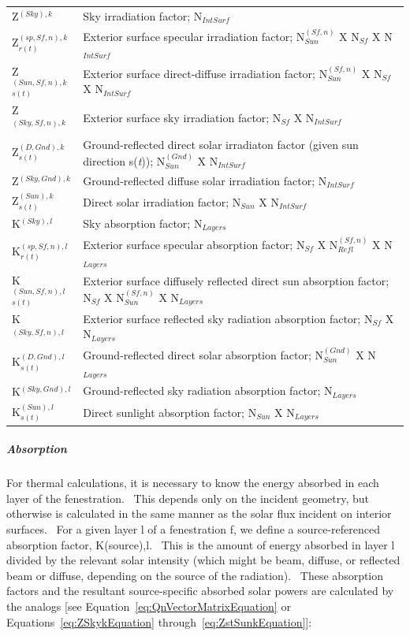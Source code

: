 \begin{longtable}[c]{p{1.5in}p{4.5in}}
Z\(^{(Sky), k}\) & Sky irradiation factor; N\(_{IntSurf}\) \tabularnewline
Z\(^{(sp,Sf,n),k}_{r(t)}\) & Exterior surface specular irradiation factor; N\(^{(Sf,n)}_{Sun}\) X N\(_{Sf}\) X N\(_{IntSurf}\) \tabularnewline
Z\(^{(Sun,Sf,n),k}_{s(t)}\) & Exterior surface direct-diffuse irradiation factor; N\(^{(Sf,n)}_{Sun}\) X N\(_{Sf}\) X N\(_{IntSurf}\) \tabularnewline
Z\(^{(Sky,Sf,n),k}\) & Exterior surface sky irradiation factor; N\(_{Sf}\) X N\(_{IntSurf}\) \tabularnewline
Z\(^{(D,Gnd),k}_{s(t)}\) & Ground-reflected direct solar irradiaton factor (given sun direction s(\emph{t})); N\(^{(Gnd)}_{Sun}\) X N\(_{IntSurf}\) \tabularnewline
Z\(^{(Sky,Gnd),k}\) & Ground-reflected diffuse solar irradiation factor; N\(_{IntSurf}\) \tabularnewline
Z\(^{(Sun),k}_{s(t)}\) & Direct solar irradiation factor; N\(_{Sun}\) X N\(_{IntSurf}\) \tabularnewline
K\(^{(Sky),l}\) & Sky absorption factor; N\(_{Layers}\) \tabularnewline
K\(^{(sp,Sf,n),l}_{r(t)}\) & Exterior surface specular absorption factor; N\(_{Sf}\) X N\(^{(Sf,n)}_{Refl}\) X N\(_{Layers}\) \tabularnewline
K\(^{(Sun,Sf,n),l}_{s(t)}\) & Exterior surface diffusely reflected direct sun absorption factor; N\(_{Sf}\) X N\(^{(Sf,n)}_{Sun}\) X N\(_{Layers}\) \tabularnewline
K\(^{(Sky,Sf,n),l}\) & Exterior surface reflected sky radiation absorption factor; N\(_{Sf}\) X N\(_{Layers}\) \tabularnewline
K\(^{(D,Gnd),l}_{s(t)}\) & Ground-reflected direct solar absorption factor; N\(^{(Gnd)}_{Sun}\) X N\(_{Layers}\) \tabularnewline
K\(^{(Sky,Gnd),l}\) & Ground-reflected sky radiation absorption factor; N\(_{Layers}\) \tabularnewline
K\(^{(Sun),l}_{s(t)}\) & Direct sunlight absorption factor; N\(_{Sun}\) X N\(_{Layers}\) \tabularnewline
\bottomrule
\end{longtable}

\subparagraph{Absorption}\label{absorption}

For thermal calculations, it is necessary to know the energy absorbed in each layer of the fenestration.~ This depends only on the incident geometry, but otherwise is calculated in the same manner as the solar flux incident on interior surfaces. ~For a given layer l of a fenestration f, we define a source-referenced absorption factor, K(source),l.~ This is the amount of energy absorbed in layer l divided by the relevant solar intensity (which might be beam, diffuse, or reflected beam or diffuse, depending on the source of the radiation).~ These absorption factors and the resultant source-specific absorbed solar powers are calculated by the analogs {[}see Equation~\ref{eq:QnVectorMatrixEquation} or Equations~\ref{eq:ZSkykEquation} through~\ref{eq:ZstSunkEquation}{]}:

